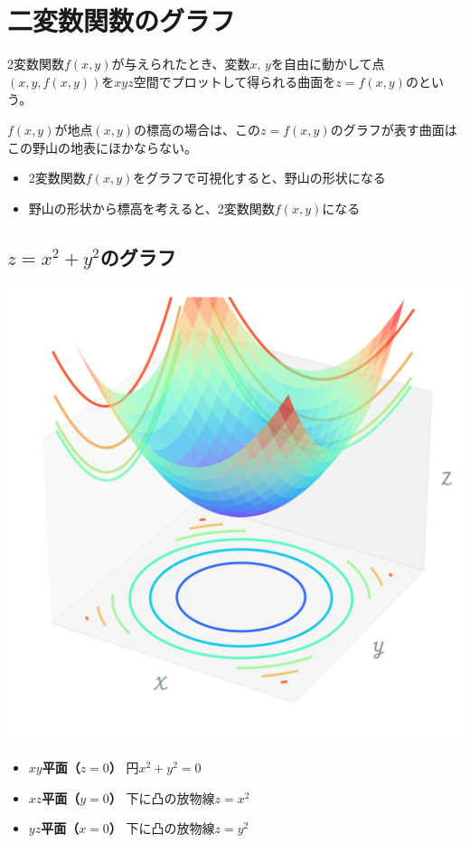 \documentclass[../../../topic_calculus]{subfiles}
\begin{document}
\sectionline
\section{二変数関数のグラフ}

2変数関数$f(x, y)$が与えられたとき、変数$x,\,y$を自由に動かして点$(x, y, f(x,y))$を$xyz$空間でプロットして得られる曲面を$z= f(x, y)$のという。

\br

$f(x,y)$が地点$(x, y)$の標高の場合は、この$z=f(x,y)$のグラフが表す曲面はこの野山の地表にほかならない。
\begin{itemize}
  \item 2変数関数$f(x, y)$をグラフで可視化すると、野山の形状になる
  \item 野山の形状から標高を考えると、2変数関数$f(x, y)$になる
\end{itemize}

\subsection{$z = x^2 + y^2$のグラフ}

\includegraphics{./python/graph_x-pow2-add-y-pow2_01.png}

\begin{itemize}
  \item {\bfseries $xy$平面（$z=0$）} 円$x^2 + y^2 =0$
  \item {\bfseries $xz$平面（$y=0$）} 下に凸の放物線$z=x^2$
  \item {\bfseries $yz$平面（$x=0$）} 下に凸の放物線$z=y^2$
\end{itemize}
\end{document}
